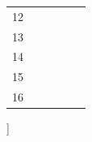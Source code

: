 \documentclass[twocolumn,landscape]{amsart}
\begin{document}
\begin{@twocolumnfalse}
\begin{center}
\begin{tabular}{cccccc}
    12&\fbox{\phantom{M}}&\fbox{\phantom{M}}&\fbox{\phantom{M}}&\fbox{\phantom{M}}&\fbox{\phantom{M}}\\
    13&\fbox{\phantom{M}}&\fbox{\phantom{M}}&\fbox{\phantom{M}}&\fbox{\phantom{M}}&\fbox{\phantom{M}}\\
    14&\fbox{\phantom{M}}&\fbox{\phantom{M}}&\fbox{\phantom{M}}&\fbox{\phantom{M}}&\fbox{\phantom{M}}\\
    15&\fbox{\phantom{M}}&\fbox{\phantom{M}}&\fbox{\phantom{M}}&\fbox{\phantom{M}}&\fbox{\phantom{M}}\\
    16&\fbox{\phantom{M}}&\fbox{\phantom{M}}&\fbox{\phantom{M}}&\fbox{\phantom{M}}&\fbox{\phantom{M}}\\
  \end{tabular}
\end{center}

\end{@twocolumnfalse}]
\end{document}
